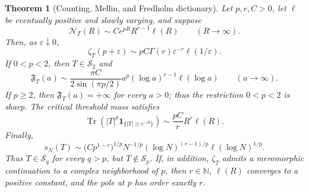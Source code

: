 \documentclass[10pt,reqno]{amsart}
\theoremstyle{plain}
\newtheorem{theorem}{Theorem}[section]
\theoremstyle{definition}
\theoremstyle{remark}
\begin{document}
\begin{theorem}[Counting, Mellin, and Fredholm dictionary]
\label{cc:thm:regular-dictionary}
Let \(p,r,C>0\), let \(\ell\) be eventually positive and slowly varying,
and suppose
\begin{equation}
 \mathcal N_T(R)
 \sim C e^{pR}R^{r-1}\ell(R)
 \qquad(R\to\infty).
 \label{cc:eq:regular-counting}
\end{equation}
Then, as \(\varepsilon\downarrow0\),
\begin{equation}
 \zeta_T(p+\varepsilon)
 \sim pC\Gamma(r)\varepsilon^{-r}\ell(1/\varepsilon).
 \label{cc:eq:regular-zeta}
\end{equation}
If \(0<p<2\), then \(T\in\mathcal S_2\) and
\begin{equation}
 \mathfrak F_T(a)
 \sim
 \frac{\pi C}{2\sin(\pi p/2)}
 a^p(\log a)^{r-1}\ell(\log a)
 \qquad(a\to\infty).
 \label{cc:eq:regular-fredholm}
\end{equation}
If \(p\geq2\), then \(\mathfrak F_T(a)=+\infty\) for every \(a>0\);
thus the restriction \(0<p<2\) is sharp.
The critical threshold mass satisfies
\begin{equation}
 \operatorname{Tr}\!\left(
 |T|^p\mathbf 1_{\{|T|\geq e^{-R}\}}
 \right)
 \sim\frac{pC}{r}R^r\ell(R).
 \label{cc:eq:threshold-mass}
\end{equation}
Finally,
\begin{equation}
 s_N(T)
 \sim
 \bigl(Cp^{1-r}\bigr)^{1/p}
 N^{-1/p}(\log N)^{(r-1)/p}\ell(\log N)^{1/p}.
 \label{cc:eq:regular-quantile}
\end{equation}
Thus \(T\in\mathcal S_q\) for every \(q>p\), but
\(T\notin\mathcal S_p\).  If, in addition, \(\zeta_T\) admits a
meromorphic continuation to a complex neighborhood of \(p\), then
\(r\in\mathbb N\), \(\ell(R)\) converges to a positive constant, and the
pole at \(p\) has order exactly \(r\).
\end{theorem}
\end{document}
